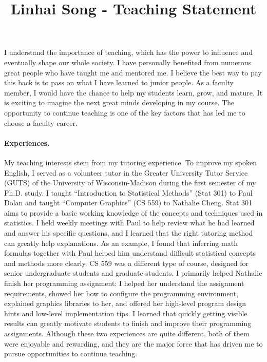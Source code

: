 \documentclass[10pt]{article}
\title{\vspace{-.7in}\bf{Linhai Song - Teaching Statement\vspace{-.4in}}}
\date{}
\begin{document}
\maketitle\vspace{-.2in}

I understand the importance of teaching, which has the power to influence and eventually shape our whole society. 
I have personally benefited from numerous great people who have taught me and mentored me. 
I believe the best way to pay this back is to pass on what I have learned to junior people. 
As a faculty member, I would have the chance to help my students learn, grow, and mature. 
It is exciting to imagine the next great minds developing in my course. 
The opportunity to continue teaching is one of the key factors that has led me to choose a faculty career.

\vspace{-0.12in}
\paragraph*{Experiences.} 
My teaching interests stem from my tutoring experience. 
To improve my spoken English, I served as a
volunteer tutor in the Greater University Tutor Service (GUTS) of the University of Wisconsin-Madison during the first semester of my Ph.D. study. 
I taught ``Introduction to Statistical Methods'' (Stat 301) to Paul Dolan and 
taught ``Computer Graphics'' (CS 559) to Nathalie Cheng. 
Stat 301 aims to provide a basic working knowledge of the concepts and techniques
used in statistics. 
I held weekly meetings with Paul to help review what he had learned and answer his specific questions, and I learned that the right tutoring method can greatly help explanations. 
As an example, I found that inferring math formulas together with Paul helped him understand difficult statistical concepts and methods more clearly. 
CS 559 was a different type of course, designed for senior undergraduate students and graduate students. 
I primarily helped Nathalie finish her programming assignment: I helped her understand the assignment requirements, 
showed her how to configure the programming environment, 
explained graphics libraries to her, 
and offered her high-level program design hints and low-level implementation tips. 
I learned that quickly getting visible results can greatly motivate students to finish and improve their programming assignments. 
Although these two experiences are quite
different, both of them were enjoyable and rewarding, and they are the major force that has driven me to pursue opportunities to continue teaching.
\end{document}
